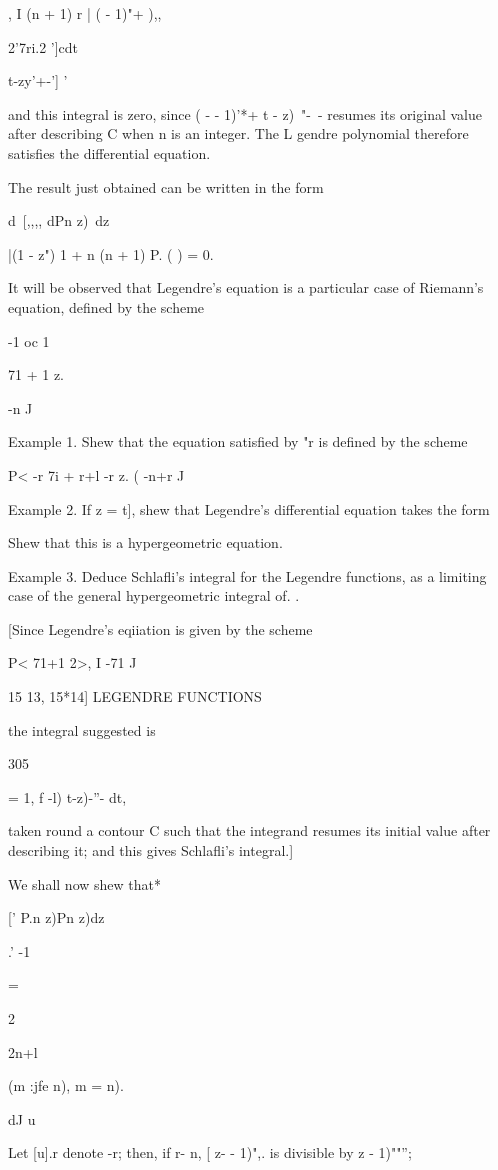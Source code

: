 , I (n + 1) r | ( - 1)"+ ),,

  2'7ri.2 ']cdt\ \ {t-zy'+-'] '

and this integral is zero, since ( - - 1)'*+ t - z)~"-~- resumes its
original value after describing C when n is an integer. The L gendre
polynomial therefore satisfies the differential equation.

The result just obtained can be written in the form

d\ [,,,, dPn z)\ dz

|(1 - z") 1 + n (n + 1) P. ( ) = 0.

It will be observed that Legendre's equation is a particular case of
Riemann's equation, defined by the scheme

-1 oc 1

71 + 1 z.

-n J

Example 1. Shew that the equation satisfied by "r is defined by the
scheme

P< -r 7i + r+l -r z. ( -n+r J

Example 2. If z = t], shew that Legendre's differential equation takes
the form

Shew that this is a hypergeometric equation.

Example 3. Deduce Schlafli's integral for the Legendre functions, as a
limiting case of the general hypergeometric integral of. .

[Since Legendre's eqiiation is given by the scheme

P< 71+1 2>, I -71 J

15 13, 15*14] LEGENDRE FUNCTIONS

the integral suggested is

305

= 1, f -l) t-z)-''- dt,

taken round a contour C such that the integrand resumes its initial
value after describing it; and this gives Schlafli's integral.]

We shall now shew that*

[' P.n z)Pn z)dz

.' -1

=

2

2n+l

(m :jfe n), m = n).

dJ u

Let [u].r denote -r; then, if r- n, [ z- - 1)",. is divisible by z -
1)""'';

}
